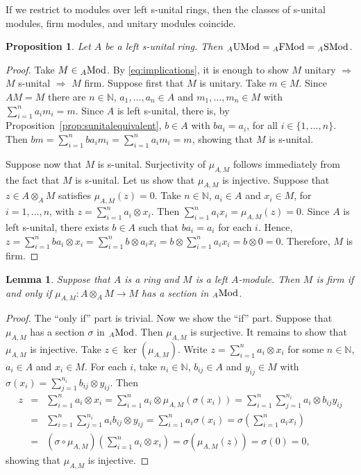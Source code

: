 \documentclass[12pt]{amsart}
\newtheorem{prop}[thm]{Proposition}
\newtheorem{lem}[thm]{Lemma}
\theoremstyle{definition}
\newcommand{\N}{\mathbb{N}}
\newcommand{\Mod}{{\rm Mod}}
\newcommand{\FMod}{{\rm FMod}}
\newcommand{\SMod}{{\rm SMod}}
\newcommand{\UMod}{{\rm UMod}}
\begin{document}
If we restrict to modules over left s-unital rings, 
then the classes of s-unital modules, firm modules, and unitary modules coincide.

\begin{prop}\label{prop:sunitalimpliesfirm}
Let $A$ be a left s-unital ring.
Then ${}_A \UMod = {}_A \FMod = {}_A \SMod$.
\end{prop}

\begin{proof}
Take $M \in {}_A \Mod$.
By \eqref{eq:implications}, it is enough 
to show $M$ unitary $\Rightarrow$
$M$ s-unital $\Rightarrow$ $M$ firm.
Suppose first that $M$ is unitary.
Take $m \in M$. 
Since $AM=M$ there are $n \in \N$,
$a_1,\ldots,a_n \in A$ and 
$m_1,\ldots,m_n \in M$ with 
$\sum_{i=1}^n a_i m_i = m$.
Since $A$ is left s-unital, there is,
by Proposition~\ref{prop:sunitalequivalent},
$b \in A$ with $b a_i = a_i$,
for all $i \in \{ 1,\ldots,n \}$.
Then $b m = 
\sum_{i=1}^n b a_i m_i = 
\sum_{i=1}^n a_i m_i = m$,
showing that $M$ is s-unital.

Suppose now that $M$ is s-unital.
Surjectivity of $\mu_{A,M}$ follows immediately from the
fact that $M$ is s-unital. Let us show that
$\mu_{A,M}$ is injective. Suppose that $z \in A \otimes_A M$
satisfies $\mu_{A,M}(z)=0$. Take $n \in \N$,
$a_i \in A$ and $x_i \in M$, for $i=1,\ldots,n$,
with $z = \sum_{i=1}^n a_i \otimes x_i$. Then
$\sum_{i=1}^n a_i x_i = \mu_{A,M}(z) = 0$.
Since $A$ is left s-unital, there exists $b \in A$
such that $b a_i = a_i$ for each $i$. Hence,
$z = \sum_{i=1}^n ba_i \otimes x_i = 
\sum_{i=1}^n b \otimes a_i x_i = 
b \otimes \sum_{i=1}^n a_i x_i = b \otimes 0 = 0$.
Therefore, $M$ is firm. 
\end{proof}

\begin{lem}\label{lem:Mfirmifsection}
Suppose that $A$ is a ring and  
$M$ is a left $A$-module.
Then $M$ is firm if and only if 
$\mu_{A,M} : A \otimes_A M \to M$ has 
a section in  ${}_A \Mod$.
\end{lem}

\begin{proof}
The ``only if'' part is trivial.
Now we show the ``if'' part.
Suppose that $\mu_{A,M}$ has a section
$\sigma$ in ${}_A \Mod$. 
Then $\mu_{A,M}$ is surjective. 
It remains to
show that $\mu_{A,M}$ is injective.
Take $z \in \ker(\mu_{A,M})$. Write 
$z = \sum_{i=1}^n a_i \otimes x_i$ for some 
$n \in \N$, $a_i \in A$ and $x_i \in M$.
For each $i$, take $n_i \in \N$, 
$b_{ij} \in A$ and $y_{ij} \in M$ with
$\sigma(x_i) = \sum_{j=1}^{n_i} b_{ij} \otimes y_{ij}$.
Then
\[
\begin{array}{rcl}
z &=& 
\sum_{i=1}^n a_i \otimes x_i 
= \sum_{i=1}^n a_i \otimes 
\mu_{A,M}(\sigma(x_i))  
= \sum_{i=1}^n \sum_{j=1}^{n_i}
a_i \otimes b_{ij} y_{ij} \\
&=& 
\sum_{i=1}^n \sum_{j=1}^{n_i}
a_i b_{ij} \otimes y_{ij} 
= \sum_{i=1}^n a_i \sigma(x_i) 
= \sigma \left( \sum_{i=1}^n a_i x_i \right) \\
&=& 
(\sigma \circ \mu_{A,M}) 
\left( \sum_{i=1}^n a_i \otimes x_i \right) 
= \sigma( \mu_{A,M} (z) ) 
= \sigma(0) = 0,
\end{array} 
\]
showing that $\mu_{A,M}$ is injective.
\end{proof}
\end{document}
